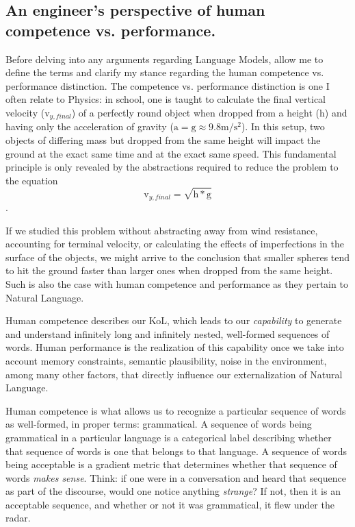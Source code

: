 \subsection*{An engineer's perspective of human competence vs. performance.}

Before delving into any arguments regarding Language Models, allow me to define the terms and clarify my stance regarding the human competence vs. performance distinction.  The competence vs. performance distinction is one I often relate to Physics: in school, one is taught to calculate the final vertical velocity ($\mathrm{v}_{y,final}$) of a perfectly round object when dropped from a height ($\mathrm{h}$) and having only the acceleration of gravity ($\mathrm{a}=\mathrm{g}\approx9.8\mathrm{m}/\mathrm{s}^2$).  In this setup, two objects of differing mass but dropped from the same height will impact the ground at the exact same time and at the exact same speed.  This fundamental principle is only revealed by the abstractions required to reduce the problem to the equation $$\mathrm{v}_{y,final} = \sqrt{\mathrm{h}*\mathrm{g}}$$.

If we studied this problem without abstracting away from wind resistance, accounting for terminal velocity, or calculating the effects of imperfections in the surface of the objects, we might arrive to the conclusion that smaller spheres tend to hit the ground faster than larger ones when dropped from the same height.  Such is also the case with human competence and performance as they pertain to Natural Language.

Human competence describes our KoL, which leads to our \textit{capability} to generate and understand infinitely long and infinitely nested, well-formed sequences of words.  Human performance is the realization of this capability once we take into account memory constraints, semantic plausibility, noise in the environment, among many other factors, that directly influence our externalization of Natural Language.

Human competence is what allows us to recognize a particular sequence of words as well-formed, in proper terms: grammatical.  A sequence of words being grammatical in a particular language is a categorical label describing whether that sequence of words is one that belongs to that language.  A sequence of words being acceptable is a gradient metric that determines whether that sequence of words \textit{makes sense}.  Think: if one were in a conversation and heard that sequence as part of the discourse, would one notice anything \textit{strange}?  If not, then it is an acceptable sequence, and whether or not it was grammatical, it flew under the radar.

